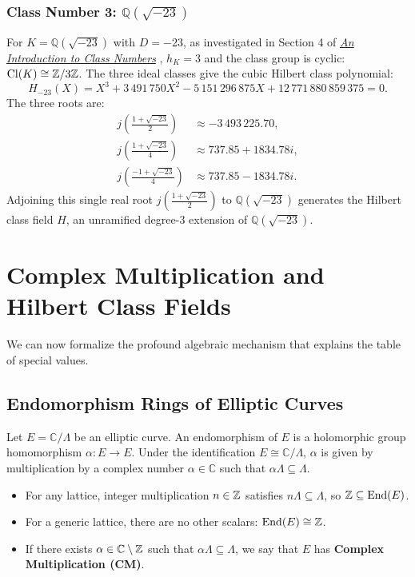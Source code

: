 \documentclass[a4paper]{article}
\begin{document}
\subsubsection{Class Number 3: \texorpdfstring{$\mathbb{Q}(\sqrt{-23})$}{Q(sqrt(-23))}}
For $K = \mathbb{Q}(\sqrt{-23})$ with $D = -23$, as investigated in Section 4 of \href{class_numbers_main.pdf}{\emph{An Introduction to Class Numbers}} \cite{kerimov2026class}, $h_K = 3$ and the class group is cyclic: $\mathrm{Cl}(K) \cong \mathbb{Z}/3\mathbb{Z}$.
The three ideal classes give the cubic Hilbert class polynomial:
\begin{equation}
 H_{-23}(X) = X^3 + 3\,491\,750 X^2 - 5\,151\,296\,875 X + 12\,771\,880\,859\,375 = 0.
 \label{eq:H_minus_23}
\end{equation}
The three roots are:
\begin{align}
 j\left(\frac{1+\sqrt{-23}}{2}\right) &\approx -3\,493\,225.70, \\
 j\left(\frac{1+\sqrt{-23}}{4}\right) &\approx 737.85 + 1834.78 i, \\
 j\left(\frac{-1+\sqrt{-23}}{4}\right) &\approx 737.85 - 1834.78 i.
\end{align}
Adjoining this single real root $j\left(\frac{1+\sqrt{-23}}{2}\right)$ to $\mathbb{Q}(\sqrt{-23})$ generates the Hilbert class field $H$, an unramified degree-3 extension of $\mathbb{Q}(\sqrt{-23})$.

\section{Complex Multiplication and Hilbert Class Fields}
\label{sec:cm_hilbert}

We can now formalize the profound algebraic mechanism that explains the table of special values.

\subsection{Endomorphism Rings of Elliptic Curves}
Let $E = \mathbb{C}/\Lambda$ be an elliptic curve. An endomorphism of $E$ is a holomorphic group homomorphism $\alpha: E \to E$. Under the identification $E \cong \mathbb{C}/\Lambda$, $\alpha$ is given by multiplication by a complex number $\alpha \in \mathbb{C}$ such that $\alpha \Lambda \subseteq \Lambda$.
\begin{itemize}[leftmargin=2em]
 \item For any lattice, integer multiplication $n \in \mathbb{Z}$ satisfies $n\Lambda \subseteq \Lambda$, so $\mathbb{Z} \subseteq \mathrm{End}(E)$.
 \item For a generic lattice, there are no other scalars: $\mathrm{End}(E) \cong \mathbb{Z}$.
 \item If there exists $\alpha \in \mathbb{C} \setminus \mathbb{Z}$ such that $\alpha \Lambda \subseteq \Lambda$, we say that $E$ has \textbf{Complex Multiplication (CM)}.
\end{itemize}
\end{document}
